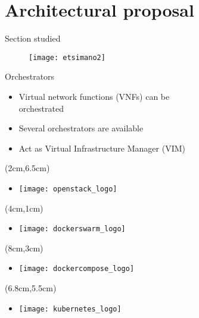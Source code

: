 \section{Architectural proposal}
\begin{frame}{Section studied}
  \begin{figure}
    \centering
    \texttt{[image: etsimano2]}
  \end{figure}
\end{frame}

\begin{frame}{Orchestrators}
  \begin{itemize}
  \item<1-> Virtual network functions (VNFs) can be\\ orchestrated
  \item<2-> Several orchestrators are available
  \item<7-> Act as Virtual Infrastructure Manager (VIM)
  \end{itemize}

  \begin{textblock*}{5cm}(2cm,6.5cm)
    \begin{itemize}
    \item[]<3-> \texttt{[image: openstack\_logo]}
    \end{itemize}
  \end{textblock*}

  \begin{textblock*}{5cm}(4cm,1cm)
    \begin{itemize}
    \item[]<4-> \texttt{[image: dockerswarm\_logo]}
    \end{itemize}
  \end{textblock*}

  \begin{textblock*}{5cm}(8cm,3cm)
    \begin{itemize}
    \item[]<5-> \texttt{[image: dockercompose\_logo]}
    \end{itemize}
  \end{textblock*}

  \begin{textblock*}{5cm}(6.8cm,5.5cm)
    \begin{itemize}
    \item[]<6-> \texttt{[image: kubernetes\_logo]}
    \end{itemize}
  \end{textblock*}
\end{frame}

